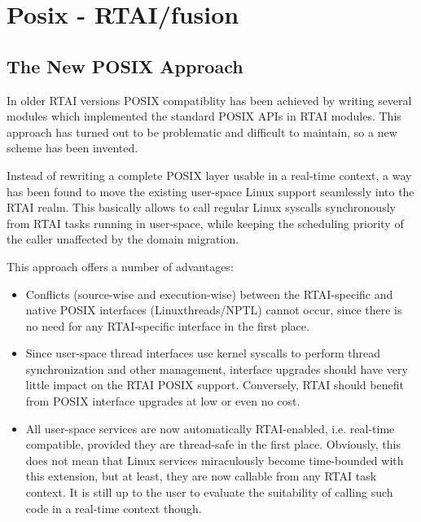 \chapter{Posix - RTAI/fusion}


\section{The New POSIX Approach}

In older RTAI versions POSIX compatiblity has been achieved by writing 
several modules which implemented the standard POSIX APIs in RTAI 
modules. This approach has turned out to be problematic and difficult
to maintain, so a new scheme has been invented. 

Instead of rewriting a complete POSIX layer usable in a real-time
context, a way has been found to move the existing user-space Linux
support seamlessly into the RTAI realm. This basically allows to call
regular Linux syscalls synchronously from RTAI tasks running in
user-space, while keeping the scheduling priority of the caller
unaffected by the domain migration.

This approach offers a number of advantages:

\begin{itemize}

\item Conflicts (source-wise and execution-wise) between the RTAI-specific
and native POSIX interfaces (Linuxthreads/NPTL) cannot occur, since
there is no need for any RTAI-specific interface in the first place.

\item Since user-space thread interfaces use kernel syscalls to perform
thread synchronization and other management, interface upgrades should
have very little impact on the RTAI POSIX support. Conversely, RTAI
should benefit from POSIX interface upgrades at low or even no cost.

\item All user-space services are now automatically RTAI-enabled,
i.e. real-time compatible, provided they are thread-safe in the first
place. Obviously, this does not mean that Linux services miraculously
become time-bounded with this extension, but at least, they are now
callable from any RTAI task context. It is still up to the user to
evaluate the suitability of calling such code in a real-time context
though.

\end{itemize}

